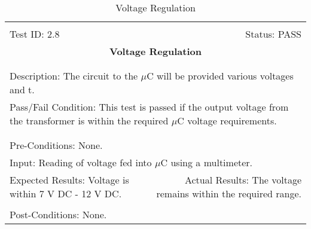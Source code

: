 \documentclass[titlepage]{article}
\begin{document}
\begin{center}
\begin{table}[h!]
\begin{tabular}{|l r|}\hline&\\[-2mm]
	Test ID: 2.8	&Status: PASS\\[-3mm]
	\multicolumn{2}{|c|}{\textbf{\large{Voltage Regulation}}}\\&\\\hline&\\[-3mm]
	\multicolumn{2}{|p{\textwidth}|}{Description: The circuit to the $\mu$C will be provided various voltages and t.}\\[1mm]
	\multicolumn{2}{|p{\textwidth}|}{Pass/Fail Condition: This test is passed if the output voltage from the transformer is within the required $\mu$C voltage requirements.}\\[1mm]\hline&\\[-3mm]\hline&\\[-3mm]
	\multicolumn{2}{|p{\textwidth}|}{Pre-Conditions: None.}\\[4mm]
	\multicolumn{2}{|p{\textwidth}|}{Input: Reading of voltage fed into $\mu$C using a multimeter.}\\[2mm]\hline
	\multicolumn{1}{|p{0.49\textwidth}}{Expected Results: Voltage is within 7 V DC - 12 V DC.}	&\multicolumn{1}{|p{0.45\textwidth}|}{Actual Results: The voltage remains within the required range.}\\\hline&\\[-3mm]
	\multicolumn{2}{|p{\textwidth}|}{Post-Conditions: None.}\\\hline
\end{tabular}
\caption{Voltage Regulation}
\end{table}
\end{center}
\newpage
\end{document}
